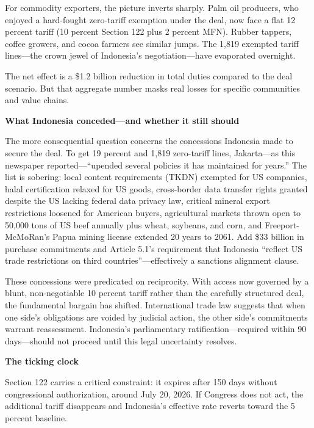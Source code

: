 \documentclass[12pt,a4paper]{article}
\begin{document}
For commodity exporters, the picture inverts sharply. Palm oil producers, who enjoyed a hard-fought zero-tariff exemption under the deal, now face a flat 12 percent tariff (10 percent Section 122 plus 2 percent MFN). Rubber tappers, coffee growers, and cocoa farmers see similar jumps. The 1,819 exempted tariff lines---the crown jewel of Indonesia's negotiation---have evaporated overnight.

The net effect is a \$1.2 billion reduction in total duties compared to the deal scenario. But that aggregate number masks real losses for specific communities and value chains.

\bigskip
\noindent\textbf{What Indonesia conceded---and whether it still should}

\medskip
The more consequential question concerns the concessions Indonesia made to secure the deal. To get 19 percent and 1,819 zero-tariff lines, Jakarta---as this newspaper reported---``upended several policies it has maintained for years.'' The list is sobering: local content requirements (TKDN) exempted for US companies, halal certification relaxed for US goods, cross-border data transfer rights granted despite the US lacking federal data privacy law, critical mineral export restrictions loosened for American buyers, agricultural markets thrown open to 50,000 tons of US beef annually plus wheat, soybeans, and corn, and Freeport-McMoRan's Papua mining license extended 20 years to 2061. Add \$33 billion in purchase commitments and Article 5.1's requirement that Indonesia ``reflect US trade restrictions on third countries''---effectively a sanctions alignment clause.

These concessions were predicated on reciprocity. With access now governed by a blunt, non-negotiable 10 percent tariff rather than the carefully structured deal, the fundamental bargain has shifted. International trade law suggests that when one side's obligations are voided by judicial action, the other side's commitments warrant reassessment. Indonesia's parliamentary ratification---required within 90 days---should not proceed until this legal uncertainty resolves.

\bigskip
\noindent\textbf{The ticking clock}

\medskip
Section 122 carries a critical constraint: it expires after 150 days without congressional authorization, around July 20, 2026. If Congress does not act, the additional tariff disappears and Indonesia's effective rate reverts toward the 5 percent baseline.
\end{document}
